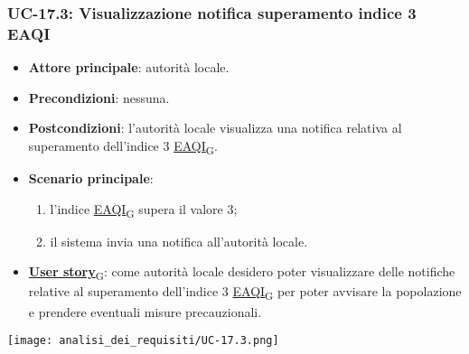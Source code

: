 \subsubsection{UC-17.3: Visualizzazione notifica superamento indice 3 EAQI}
\begin{itemize}
	\item \textbf{Attore principale}: autorità locale.
	\item \textbf{Precondizioni}: nessuna.
	\item \textbf{Postcondizioni}: l'autorità locale visualizza una notifica relativa al superamento dell'indice 3 \href{https://7last.github.io/docs/pb/documentazione-interna/glossario\#european-air-quality-index}{EAQI\textsubscript{G}}.
	\item \textbf{Scenario principale}:
	      \begin{enumerate}
		      \item l'indice \href{https://7last.github.io/docs/pb/documentazione-interna/glossario\#european-air-quality-index}{EAQI\textsubscript{G}} supera il valore 3;
		      \item il sistema invia una notifica all'autorità locale.
	      \end{enumerate}
	\item \href{https://7last.github.io/docs/pb/documentazione-interna/glossario\#user-story}{\textbf{User story}\textsubscript{G}}:
	      come autorità locale desidero poter visualizzare delle notifiche relative al superamento dell'indice 3 \href{https://7last.github.io/docs/pb/documentazione-interna/glossario\#european-air-quality-index}{EAQI\textsubscript{G}}
	      per poter avvisare la popolazione e prendere eventuali misure precauzionali.
\end{itemize}
\begin{center}
	\texttt{[image: analisi\_dei\_requisiti/UC-17.3.png]}
\end{center}

\newpage
